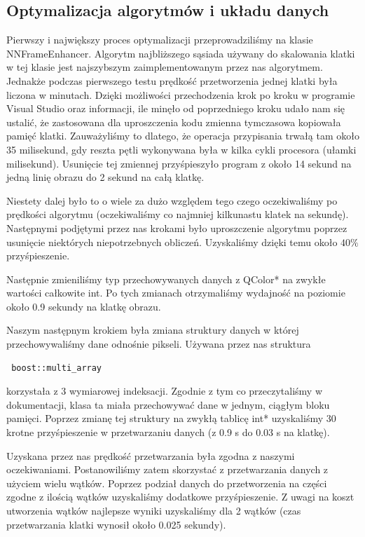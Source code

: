 \documentclass[twoside]{projektInzynierskiMS}
\begin{document}
\subsection{Optymalizacja algorytmów i układu danych}
Pierwszy i największy proces optymalizacji przeprowadziliśmy na klasie NNFrameEnhancer. Algorytm najbliższego sąsiada używany do skalowania klatki w tej klasie jest najszybszym zaimplementowanym przez nas algorytmem. Jednakże podczas pierwszego testu prędkość przetworzenia jednej klatki była liczona w minutach. Dzięki możliwości przechodzenia krok po kroku w programie Visual Studio oraz informacji, ile minęło od poprzedniego kroku udało nam się ustalić, że zastosowana dla uproszczenia kodu zmienna tymczasowa kopiowała pamięć klatki. Zauważyliśmy to dlatego, że operacja przypisania trwałą tam około 35 milisekund, gdy reszta pętli wykonywana była w kilka cykli procesora (ułamki milisekund). Usunięcie tej zmiennej przyśpieszyło program z około 14 sekund na jedną linię obrazu do 2 sekund na całą klatkę.

Niestety dalej było to o wiele za dużo względem tego czego oczekiwaliśmy po prędkości algorytmu (oczekiwaliśmy co najmniej kilkunastu klatek na sekundę). Następnymi podjętymi przez nas krokami było uproszczenie algorytmu poprzez usunięcie niektórych niepotrzebnych obliczeń. Uzyskaliśmy dzięki temu około $40\%$ przyśpieszenie. 

Następnie zmieniliśmy typ przechowywanych danych z QColor* na zwykłe wartości całkowite int. Po tych zmianach otrzymaliśmy wydajność na poziomie około 0.9 sekundy na klatkę obrazu. 

Naszym następnym krokiem była zmiana struktury danych w której przechowywaliśmy dane odnośnie pikseli. Używana przez nas struktura \begin{verbatim} boost::multi_array \end{verbatim} korzystała z 3 wymiarowej indeksacji. Zgodnie z tym co przeczytaliśmy w dokumentacji, klasa ta miała przechowywać dane w jednym, ciągłym bloku pamięci. Poprzez zmianę tej struktury na zwykłą tablicę int* uzyskaliśmy 30 krotne przyśpieszenie w przetwarzaniu danych (z 0.9 s do 0.03 s na klatkę).

Uzyskana przez nas prędkość przetwarzania była zgodna z naszymi oczekiwaniami. Postanowiliśmy zatem skorzystać z przetwarzania danych z użyciem wielu wątków. Poprzez podział danych do przetworzenia na części zgodne z ilością wątków uzyskaliśmy dodatkowe przyśpieszenie. Z uwagi na koszt utworzenia wątków najlepsze wyniki uzyskaliśmy dla 2 wątków (czas przetwarzania klatki wynosił około 0.025 sekundy). 
\end{document}
